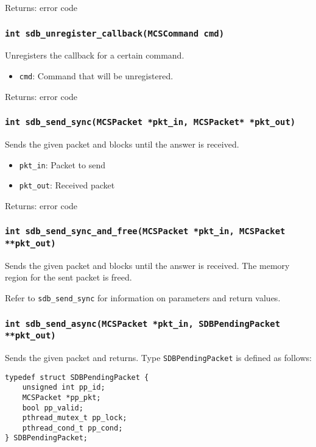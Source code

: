 \documentclass[12pt,a4paper]{report}
\begin{document}
Returns: error code

\subsubsection*{\texttt{int sdb\_unregister\_callback(MCSCommand cmd)}}
Unregisters the callback for a certain command.

\begin{itemize}
\item \texttt{cmd}: Command that will be unregistered.
\end{itemize}

Returns: error code

\subsubsection*{\texttt{int sdb\_send\_sync(MCSPacket *pkt\_in, MCSPacket* *pkt\_out)}}
Sends the given packet and blocks until the answer is received.

\begin{itemize}
\item \texttt{pkt\_in}: Packet to send
\item \texttt{pkt\_out}: Received packet
\end{itemize}

Returns: error code

\subsubsection*{\texttt{int sdb\_send\_sync\_and\_free(MCSPacket *pkt\_in, MCSPacket **pkt\_out)}}
Sends the given packet and blocks until the answer is received. The memory region for the sent packet is freed.

Refer to \texttt{sdb\_send\_sync} for information on parameters and return values.

\subsubsection*{\texttt{int sdb\_send\_async(MCSPacket *pkt\_in, SDBPendingPacket **pkt\_out)}}
Sends the given packet and returns. Type \texttt{SDBPendingPacket} is defined as follows:

\begin{lstlisting}
typedef struct SDBPendingPacket {
    unsigned int pp_id;
    MCSPacket *pp_pkt;
    bool pp_valid;
    pthread_mutex_t pp_lock;
    pthread_cond_t pp_cond;
} SDBPendingPacket;
\end{lstlisting}
\end{document}
